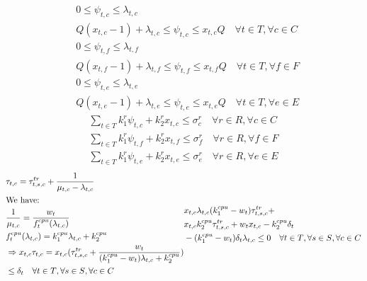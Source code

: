 \documentclass[conference]{IEEEtran}
\begin{document}
    \begin{subequations}
      \begin{align}
      &0 \leq \psi_{t,c} \leq \lambda_{t,c} \\
      &Q(x_{t,c}-1)+\lambda_{t,c} \leq \psi_{t,c} \leq x_{t,c}Q \quad \forall{t\in T}, \forall{c \in C} \\
      &0 \leq \psi_{t,f} \leq \lambda_{t,f} \\
      &Q(x_{t,f}-1)+\lambda_{t,f} \leq \psi_{t,f} \leq x_{t,f}Q \quad \forall{t \in T}, \forall{f \in F} \\
      &0 \leq \psi_{t,e} \leq \lambda_{t,e} \\
      &Q(x_{t,e}-1)+\lambda_{t,e} \leq \psi_{t,e} \leq x_{t,e}Q \quad \forall{t \in T}, \forall{e \in E}
      \end{align}
    \end{subequations}
    \begin{subequations}
      \begin{align}
        \sum_{t \in T}k_1^r\psi_{t,c}+k_2^rx_{t,c} \le \sigma_c^r \quad \forall{r \in R}, \forall{c \in C} \\
        \sum_{t \in T}k_1^r\psi_{t,f}+k_2^rx_{t,f} \le \sigma_f^r \quad \forall{r \in R}, \forall{f \in F} \\
        \sum_{t \in T}k_1^r\psi_{t,e}+k_2^rx_{t,e} \le \sigma_e^r \quad \forall{r \in R}, \forall{e \in E}
      \end{align}
    \end{subequations}
    \begin{subequations}
      \begin{align}
        &\tau_{t,c} = \tau_{t,s,c}^{tr} + \frac{1}{\mu_{t,c}-\lambda_{t,c}} \\
        &\notag\text{We have:} \\
        &\frac{1}{\mu_{t,c}} = \frac{w_t}{f_t^{cpu}(\lambda_{t,c})} \\
        &f_t^{cpu}(\lambda_{t,c}) = k_1^{cpu}\lambda_{t,c}+k_2^{cpu} \\
        &\notag\Rightarrow x_{t,c} \tau_{t,c} = x_{t,c} (\tau_{t,s,c}^{tr} + \frac{w_t}{(k_1^{cpu}-w_t)\lambda_{t,c} + k_2^{cpu}}) \\
        &\le \delta_t \quad \forall{t \in T}, \forall{s \in S}, \forall{c \in C}
      \end{align}
      \begin{align}
        &\notag x_{t,c}\lambda_{t,c}(k_1^{cpu}-w_t)\tau^{tr}_{t,s,c} + \\ &\notag x_{t,c}k_2^{cpu}\tau_{t,s,c}^{tr}+w_t x_{t,c}-k_2^{cpu}\delta_t \\ &-(k_1^{cpu}-w_t)\delta_t\lambda_{t,c} \le 0 \quad \forall{t \in T}, \forall{s \in S}, \forall{c \in C}
      \end{align}
    \end{subequations}
\end{document}
